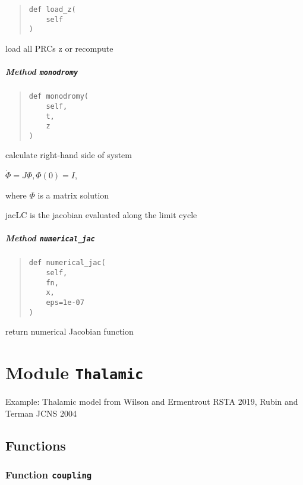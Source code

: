 \documentclass[english,a4paper,oneside]{article}
\let\oldsubparagraph\subparagraph
\renewcommand{\subparagraph}[1]{\oldsubparagraph{#1}\mbox{}}
\begin{document}
\begin{quote}
\begin{verbatim}
def load_z(
    self
)
\end{verbatim}
\end{quote}

load all PRCs z or recompute

\hypertarget{StrongCoupling.StrongCoupling.monodromy}{%
\subparagraph{\texorpdfstring{Method
\texttt{monodromy}}{Method monodromy}}\label{StrongCoupling.StrongCoupling.monodromy}}

\begin{quote}
\begin{verbatim}
def monodromy(
    self,
    t,
    z
)
\end{verbatim}
\end{quote}

calculate right-hand side of system

\(\dot \Phi = J\Phi, \Phi(0)=I\),

where \(\Phi\) is a matrix solution

jacLC is the jacobian evaluated along the limit cycle

\hypertarget{StrongCoupling.StrongCoupling.numerical_jac}{%
\subparagraph{\texorpdfstring{Method
\texttt{numerical\_jac}}{Method numerical\_jac}}\label{StrongCoupling.StrongCoupling.numerical_jac}}

\begin{quote}
\begin{verbatim}
def numerical_jac(
    self,
    fn,
    x,
    eps=1e-07
)
\end{verbatim}
\end{quote}

return numerical Jacobian function

\hypertarget{Thalamic}{%
\section{\texorpdfstring{Module
\texttt{Thalamic}}{Module Thalamic}}\label{Thalamic}}

Example: Thalamic model from Wilson and Ermentrout RSTA 2019, Rubin and
Terman JCNS 2004

\hypertarget{functions-1}{%
\subsection{Functions}\label{functions-1}}

\hypertarget{Thalamic.coupling}{%
\subsubsection{\texorpdfstring{Function
\texttt{coupling}}{Function coupling}}\label{Thalamic.coupling}}
\end{document}
